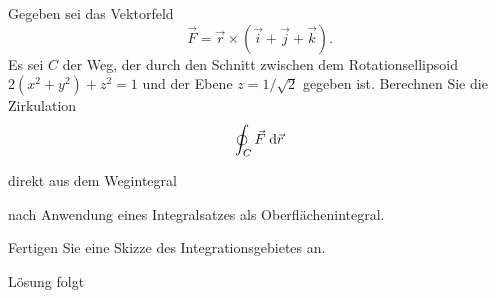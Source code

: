 \documentclass{atistandalonetask}
\begin{document}
  \begin{atiTask}[
    title = Integralsatz
  ]

Gegeben sei das Vektorfeld 
\[\vec{F}=\vec{r}\times (\vec{i}+\vec{j}+\vec{k}).\] Es sei $C$ der Weg, der durch den Schnitt zwischen dem Rotationsellipsoid $2(x^2+y^2)+z^2=1$ und der Ebene $z=1/\sqrt{2}$ gegeben ist.  Berechnen Sie die Zirkulation 
\[\oint _C\vec{F}\;\mathrm{d}\vec{r}
\]
	\begin{atiSubtasks}
		\item direkt aus dem Wegintegral
		\item nach Anwendung eines Integralsatzes als Oberflächenintegral.
	\end{atiSubtasks} 
	Fertigen Sie eine Skizze des Integrationsgebietes an.
  \end{atiTask}
  \begin{atiSolution}
  Lösung folgt
  \end{atiSolution}
\end{document}
